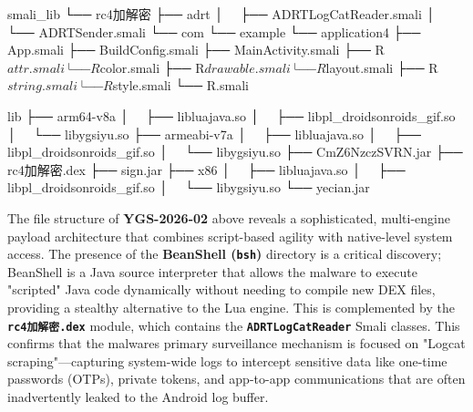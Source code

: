 \documentclass[
]{article}
\newenvironment{Shaded}{}{}
\newcommand{\NormalTok}[1]{#1}
\begin{document}
\begin{Shaded}
\begin{Highlighting}[]
\NormalTok{smali\_lib}
\NormalTok{└── rc4加解密}
\NormalTok{    ├── adrt}
\NormalTok{    │   ├── ADRTLogCatReader.smali}
\NormalTok{    │   └── ADRTSender.smali}
\NormalTok{    └── com}
\NormalTok{        └── example}
\NormalTok{            └── application4}
\NormalTok{                ├── App.smali}
\NormalTok{                ├── BuildConfig.smali}
\NormalTok{                ├── MainActivity.smali}
\NormalTok{                ├── R$attr.smali}
\NormalTok{                ├── R$color.smali}
\NormalTok{                ├── R$drawable.smali}
\NormalTok{                ├── R$layout.smali}
\NormalTok{                ├── R$string.smali}
\NormalTok{                ├── R$style.smali}
\NormalTok{                └── R.smali}
\end{Highlighting}
\end{Shaded}

\begin{Shaded}
\begin{Highlighting}[]
\NormalTok{lib}
\NormalTok{├── arm64{-}v8a}
\NormalTok{│   ├── libluajava.so}
\NormalTok{│   ├── libpl\_droidsonroids\_gif.so}
\NormalTok{│   └── libygsiyu.so}
\NormalTok{├── armeabi{-}v7a}
\NormalTok{│   ├── libluajava.so}
\NormalTok{│   ├── libpl\_droidsonroids\_gif.so}
\NormalTok{│   └── libygsiyu.so}
\NormalTok{├── CmZ6NzczSVRN.jar}
\NormalTok{├── rc4加解密.dex}
\NormalTok{├── sign.jar}
\NormalTok{├── x86}
\NormalTok{│   ├── libluajava.so}
\NormalTok{│   ├── libpl\_droidsonroids\_gif.so}
\NormalTok{│   └── libygsiyu.so}
\NormalTok{└── yecian.jar}
\end{Highlighting}
\end{Shaded}

The file structure of \textbf{YGS-2026-02} above reveals a
sophisticated, multi-engine payload architecture that combines
script-based agility with native-level system access. The presence of
the \textbf{BeanShell (\texttt{bsh})} directory is a critical discovery;
BeanShell is a Java source interpreter that allows the malware to
execute "scripted" Java code dynamically without needing to compile new
DEX files, providing a stealthy alternative to the Lua engine. This is
complemented by the \textbf{\texttt{rc4加解密.dex}} module, which
contains the \textbf{\texttt{ADRTLogCatReader}} Smali classes. This
confirms that the malware\textquotesingle s primary surveillance
mechanism is focused on "Logcat scraping"---capturing system-wide logs
to intercept sensitive data like one-time passwords (OTPs), private
tokens, and app-to-app communications that are often inadvertently
leaked to the Android log buffer.
\end{document}
